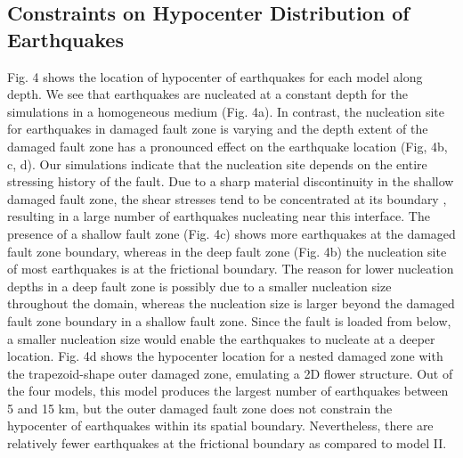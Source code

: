 \documentclass[11pt]{article}
\begin{document}
\subsection{Constraints on Hypocenter Distribution of Earthquakes}
Fig. 4 shows the location of hypocenter of earthquakes for each model along depth. We see that earthquakes are nucleated at a constant depth for the simulations in a homogeneous medium (Fig. 4a). In contrast, the nucleation site for earthquakes in damaged fault zone is varying and the depth extent of the damaged fault zone has a pronounced effect on the earthquake location (Fig, 4b, c, d). Our simulations indicate that the nucleation site depends on the entire stressing history of the fault. Due to a sharp material discontinuity in the shallow damaged fault zone, the shear stresses tend to be concentrated at its boundary \citep{bonafede_2002, rybicki_2002}, resulting in a large number of earthquakes nucleating near this interface. The presence of a shallow fault zone (Fig. 4c) shows more earthquakes at the damaged fault zone boundary, whereas in the deep fault zone (Fig. 4b) the nucleation site of most earthquakes is at the frictional boundary. The reason for lower nucleation depths in a deep fault zone is possibly due to a smaller nucleation size throughout the domain, whereas the nucleation size is larger beyond the damaged fault zone boundary in a shallow fault zone. Since the fault is loaded from below, a smaller nucleation size would enable the earthquakes to nucleate at a deeper location. Fig. 4d shows the hypocenter location for a nested damaged zone with the trapezoid-shape outer damaged zone, emulating a 2D flower structure. Out of the four models, this model produces the largest number of earthquakes between 5 and 15 km, but the outer damaged fault zone does not constrain the hypocenter of earthquakes within its spatial boundary. Nevertheless, there are relatively fewer earthquakes at the frictional boundary as compared to model II.
\end{document}
